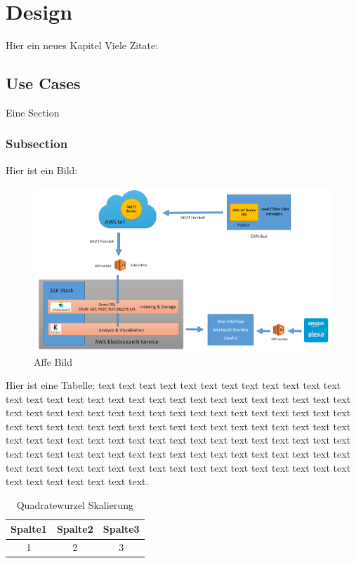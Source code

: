 \chapter{Design}
    Hier ein neues Kapitel
    Viele Zitate: \cite{patterson} \cite{krizhevsky} \cite{matlab} \cite{pitts} \cite{lawrence} \cite{miesbach}
    \section{Use Cases}
        Eine Section
        \subsection{Subsection}
        
        
Hier ist ein Bild:        
            \begin{figure}[h]
                \includegraphics[scale=0.2]{Abbildungen/Kapitel4/Big-architecture.png}
                \centering
                \caption{Affe Bild}
                \label{Abb:Affe}   
            \end{figure}  
            
Hier ist eine Tabelle: text text text text text text text text text text text text text text text text text text text text text text text text text text text text text text text text text text text text text text text text text text text text text text text text text text text text text text text text text text text text text text text text text text text text text text text text text text text text text text text text text text text text text text text text text text text text text text text text text text text text text text text text text text text text text text text text text text text text text text text text text.           
            
             \begin{table}[h]
                \begin{tabular}{ccc}
                      \hline
                      Spalte1 & Spalte2 & Spalte3\\                      
                      \hline
                      1 & 2 & 3\\
                      \hline
                \end{tabular}
                \centering
                \caption{Quadratewurzel Skalierung}
                \label{Tab:Quadratewurzel Skalierung}
            \end{table}
            
